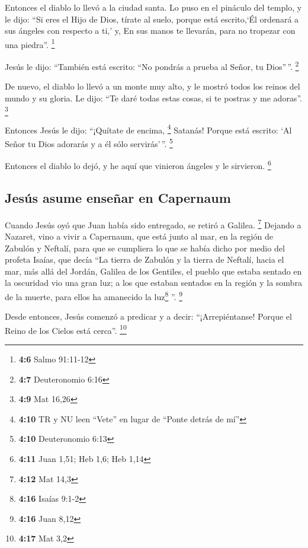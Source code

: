  Entonces el diablo lo llevó a la ciudad santa. Lo puso en
el pináculo del templo,  y le dijo: ``Si eres el Hijo de
Dios, tírate al suelo, porque está escrito,`Él ordenará a sus ángeles
con respecto a ti,' y, En sus manos te llevarán, para no tropezar con
una piedra''. \footnote{\textbf{4:6} Salmo 91:11-12}

 Jesús le dijo: ``También está escrito: ``No pondrás a
prueba al Señor, tu Dios''\,''. \footnote{\textbf{4:7} Deuteronomio 6:16}

 De nuevo, el diablo lo llevó a un monte muy alto, y le
mostró todos los reinos del mundo y su gloria.  Le dijo:
``Te daré todas estas cosas, si te postras y me adoras''. \footnote{\textbf{4:9}
  Mat 16,26}

 Entonces Jesús le dijo: ``¡Quítate de encima,
\footnote{\textbf{4:10} TR y NU leen ``Vete'' en lugar de ``Ponte detrás
  de mí''} Satanás! Porque está escrito: `Al Señor tu Dios adorarás y a
él sólo servirás'\,''. \footnote{\textbf{4:10} Deuteronomio 6:13}

 Entonces el diablo lo dejó, y he aquí que vinieron
ángeles y le sirvieron. \footnote{\textbf{4:11} Juan 1,51; Heb 1,6; Heb
  1,14}

\hypertarget{jesuxfas-asume-enseuxf1ar-en-capernaum}{%
\subsection{Jesús asume enseñar en
Capernaum}\label{jesuxfas-asume-enseuxf1ar-en-capernaum}}

 Cuando Jesús oyó que Juan había sido entregado, se
retiró a Galilea. \footnote{\textbf{4:12} Mat 14,3} 
Dejando a Nazaret, vino a vivir a Capernaum, que está junto al mar, en
la región de Zabulón y Neftalí,  para que se cumpliera lo
que se había dicho por medio del profeta Isaías, que decía
 ``La tierra de Zabulón y la tierra de Neftalí, hacia el
mar, más allá del Jordán, Galilea de los Gentiles,  el
pueblo que estaba sentado en la oscuridad vio una gran luz; a los que
estaban sentados en la región y la sombra de la muerte, para ellos ha
amanecido la luz\footnote{\textbf{4:16} Isaías 9:1-2} ''. \footnote{\textbf{4:16}
  Juan 8,12}

 Desde entonces, Jesús comenzó a predicar y a decir:
``¡Arrepiéntanse! Porque el Reino de los Cielos está cerca''.
\footnote{\textbf{4:17} Mat 3,2}

